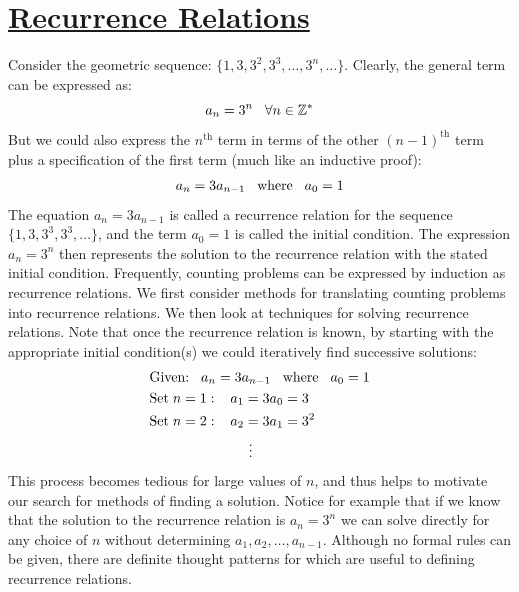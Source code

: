 \documentclass[12pt, letterpaper, onecolumn, conference, final]{IEEEtran}
\theoremstyle{definition}
\theoremstyle{plain}
\begin{document}
\vspace{.3cm}
\section{\textbf{\underline{Recurrence Relations}}}
\vspace{.3cm}
\noindent
Consider the geometric sequence: $\{1,3,3^2,3^3,\dots,3^n,\dots\}$. Clearly, the general term can be expressed as:
\begin{equation*}
a_n = 3^n \hspace{.3cm} \forall n \in \mathbb{Z}^*
\end{equation*}
But we could also express the $n^\text{th}$ term in terms of the other $(n-1)^\text{th}$ term plus a specification of the first term (much like an inductive proof):
\begin{equation*}
a_n = 3a_{n-1} \hspace{.3cm} \text{where} \hspace{.3cm} a_0 = 1
\end{equation*}
The equation $a_n=3a_{n-1}$ is called a recurrence relation for the sequence $\{1,3,3^3,3^3,\dots\}$, and the term $a_0=1$ is called the initial condition. The expression $a_n=3^n$ then represents the solution to the recurrence relation with the stated initial condition. Frequently, counting problems can be expressed by induction as recurrence relations. We first consider methods for translating counting problems into recurrence relations. We then look at techniques for solving recurrence relations. Note that once the recurrence relation is known, by starting with the appropriate initial condition(s) we could iteratively find successive solutions:
\begin{equation*}
\begin{split}
&\text{Given:} \hspace{.3cm} a_n = 3a_{n-1} \hspace{.3cm} \text{where} \hspace{.3cm} a_0 = 1 \\
&\text{Set} \hspace{.1cm} n = 1: \hspace{.3cm} a_1 = 3a_0 = 3 \\
&\text{Set} \hspace{.1cm} n = 2: \hspace{.3cm} a_2 = 3a_1 = 3^2 \\
& \hspace{2.5cm} \vdots
\end{split}
\end{equation*}
This process becomes tedious for large values of $n$, and thus helps to motivate our search for methods of finding a solution. Notice for example that if we know that the solution to the recurrence relation is $a_n = 3^n$ we can solve directly for any choice of $n$ without determining $a_1, a_2, \dots, a_{n-1}$. Although no formal rules can be given, there are definite thought patterns for which are useful to defining recurrence relations.
\end{document}
